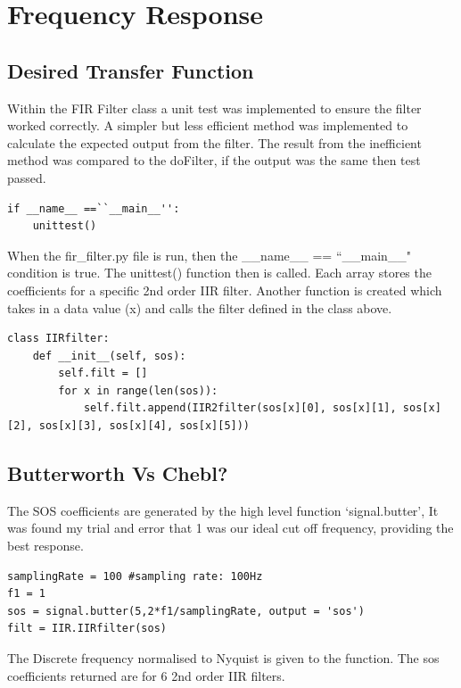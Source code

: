 \documentclass{article}
\begin{document}
\section{Frequency Response}
\subsection{Desired Transfer Function}
Within the FIR Filter class a unit test was implemented to ensure the filter worked correctly. A simpler but less efficient method was implemented to calculate the expected output from the filter. The result from the inefficient method was compared to the doFilter, if the output was the same then test passed.

\lstset{language=Python}
\begin{lstlisting}
if __name__ ==``__main__'':
    unittest()
\end{lstlisting}
When the fir\_filter.py file is run, then the \_\_name\_\_ == ``\_\_main\_\_" condition is true. The unittest() function then is called.
Each array stores the coefficients for a specific 2nd order IIR filter. Another function is created which takes in a data value (x) and calls the filter defined in the class above.
\newline 
\lstset{language=Python}
\begin{lstlisting}
class IIRfilter: 
    def __init__(self, sos):
        self.filt = []
        for x in range(len(sos)):
            self.filt.append(IIR2filter(sos[x][0], sos[x][1], sos[x][2], sos[x][3], sos[x][4], sos[x][5]))
\end{lstlisting}

\subsection{Butterworth Vs Chebl?}
The SOS coefficients are generated by the high level function `signal.butter', It was found my trial and error that 1 was our ideal cut off frequency, providing the best response.
\lstset{language=Python}
\begin{lstlisting}
samplingRate = 100 #sampling rate: 100Hz
f1 = 1
sos = signal.butter(5,2*f1/samplingRate, output = 'sos') 
filt = IIR.IIRfilter(sos) 
\end{lstlisting}
\newline
\newline
The Discrete frequency normalised to Nyquist is given to the function. The sos coefficients returned are for 6 2nd order IIR filters. 
\end{document}
